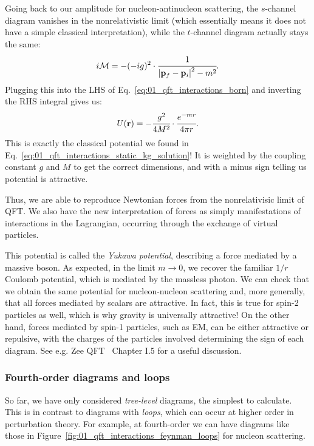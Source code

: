Going back to our amplitude for nucleon-antinucleon scattering, the $s$-channel diagram vanishes in the nonrelativistic limit (which essentially means it does not have a simple classical interpretation), while the $t$-channel diagram actually stays the same:
\begin{equation}
	\label{eq:01_qft_interactions_na_scattering_nr}
	i \mathcal M = -(-ig)^2 \cdot \cfrac{1}{\left\lvert \mathbf{p}_f - \mathbf{p}_i \right\rvert^2 - m^2}.
\end{equation}
Plugging this into the LHS of Eq.~\ref{eq:01_qft_interactions_born} and inverting the RHS integral gives us:
\begin{equation}
	\label{eq:01_qft_interactions_yukawa_potential}
	U(\mathbf{r}) = -\cfrac{g^2}{4M^2} \cdot \cfrac{e^{-mr}}{4\pi r}.
\end{equation}
This is exactly the classical potential we found in Eq.~\ref{eq:01_qft_interactions_static_kg_solution}!
It is weighted by the coupling constant $g$ and $M$ to get the correct dimensions, and with a minus sign telling us potential is attractive.

Thus, we are able to reproduce Newtonian forces from the nonrelativisic limit of QFT.
We also have the new interpretation of forces as simply manifestations of interactions in the Lagrangian, occurring through the exchange of virtual particles.

This potential is called the \textit{Yukawa potential}, describing a force mediated by a massive boson.
As expected, in the limit $m \rightarrow 0$, we recover the familiar $1/r$ Coulomb potential, which is mediated by the massless photon.
We can check that we obtain the same potential for nucleon-nucleon scattering and, more generally, that all forces mediated by scalars are attractive.
In fact, this is true for spin-2 particles as well, which is why gravity is universally attractive!
On the other hand, forces mediated by spin-1 particles, such as EM, can be either attractive or repulsive, with the charges of the particles involved determining the sign of each diagram.
See e.g. Zee QFT~\cite{Zee:2003mt} Chapter I.5 for a useful discussion.


\subsubsection{Fourth-order diagrams and loops}

So far, we have only considered \textit{tree-level} diagrams, the simplest to calculate.
This is in contrast to diagrams with \textit{loops}, which can occur at higher order in perturbation theory.
For example, at fourth-order we can have diagrams like those in Figure~\ref{fig:01_qft_interactions_feynman_loops} for nucleon scattering. 

